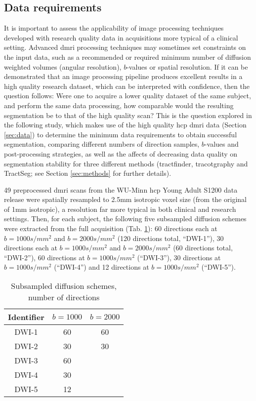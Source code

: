 \subsection{Data requirements}\label{sec:ismrmdiff}

It is important to assess the applicability of image processing techniques developed with research quality data in acquisitions more typical of a clinical setting.
Advanced \gls{dmri} processing techniques may sometimes set constraints on the input data, such as a recommended or required minimum number of diffusion weighted volumes (angular resolution), $b$-values or spatial resolution.
If it can be demonstrated that an image processing pipeline produces excellent results in a high quality research dataset, which can be interpreted with confidence, then the question follows:
Were one to acquire a lower quality dataset of the same subject, and perform the same data processing, how comparable would the resulting segmentation be to that of the high quality scan?
This is the question explored in the following study, which makes use of the high quality \gls{hcp} \gls{dmri} data (Section \ref{sec:data}) to determine the minimum data requirements to obtain successful segmentation, comparing different numbers of direction samples, $b$-values and post-processing strategies, as well as the affects of decreasing data quality on segmentation stability for three different methods (tractfinder, tracotgraphy and TractSeg; see Section \ref{sec:methods} for further details).


49 preprocessed \gls{dmri} scans from the WU-Minn \gls{hcp} Young Adult S1200 data release were spatially resampled to 2.5mm isotropic voxel size (from the original of 1mm isotropic), a resolution far more typical in both clinical and research settings.
Then, for each subject, the following five subsampled diffusion schemes were extracted from the full acquisition (Tab. \ref{tab:subschemes}):
60 directions each at $b=1000s/mm^2$ and $b=2000s/mm^2$ (120 directions total, ``DWI-1”), 30 directions each at $b=1000s/mm^2$ and $b=2000s/mm^2$ (60 directions total, ``DWI-2”), 60 directions at $b=1000s/mm^2$ (``DWI-3”), 30 directions at $b=1000s/mm^2$ (``DWI-4”) and 12 directions at $b=1000s/mm^2$ (``DWI-5”).

\begin{table}
  \centering
  \begin{tabular}{c c c} \toprule
    Identifier & $b = 1000$ & $b=2000$ \\
    \midrule
    DWI-1 & 60 & 60 \\
    DWI-2 & 30 & 30 \\
    DWI-3 & 60 &    \\
    DWI-4 & 30 &    \\
    DWI-5 & 12 &    \\ \bottomrule
  \end{tabular}
  \caption{Subsampled diffusion schemes, number of directions}
  \label{tab:subschemes}
\end{table}

